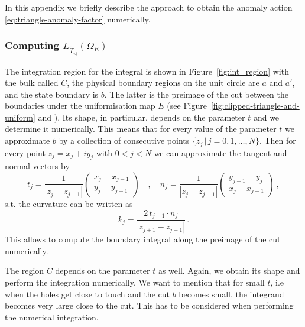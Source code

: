 \documentclass[11pt,a4paper]{article}
\numberwithin{equation}{section}
\begin{document}
In this appendix we briefly describe the approach to obtain the anomaly action \eqref{eq:triangle-anomaly-factor} numerically. 


\subsubsection*{Computing $L_{\widetilde T_\triangleleft}(\Omega_E)$}

The integration region for the integral is shown in Figure~\ref{fig:int_region} with the bulk called $C$, the physical boundary regions on the unit circle are $a$ and $a'$, and the state boundary is $b$. The latter is the preimage of the cut between the boundaries under the uniformisation map $E$  (see Figure~\ref{fig:clipped-triangle-and-uniform} and \cite[Fig.\,15]{Brehm:2021wev}). Its shape, in particular, depends on the parameter $t$ and we determine it numerically. This means that for every value of the parameter $t$ we approximate $b$ by a collection of consecutive points $\{z_j\, | \, j= 0,1,\dots, N\}$. Then for every point $z_j = x_j + i y_j $ with $0<j<N$ we can approximate the tangent and normal vectors by 
%
\begin{equation}
    t_j = \frac{1}{|z_{j}-z_{j-1}|} \left(\begin{matrix}
        x_j -x_{j-1}\\ y_j - y_{j-1}
    \end{matrix}\right)
    \quad , \quad
    n_j = \frac{1}{|z_{j}-z_{j-1}|} \left(\begin{matrix}
        y_{j-1} - y_{j} \\  x_j -x_{j-1}
    \end{matrix}\right) \ ,
\end{equation}
%
s.t. the curvature can be written as
%
\begin{equation}
    k_j =   \frac{2\,t_{j+1}\cdot n_j}{|z_{j+1}-z_{j-1}|}\,.
\end{equation}
%
This allows to compute the boundary integral along the preimage of the cut numerically. 

The region $C$ depends on the parameter $t$ as well. Again, we obtain its shape  and perform the integration numerically. We want to mention that for small $t$, i.e when the holes get close to touch and the cut $b$ becomes small, the integrand becomes very large close to the cut. This has to be considered when performing the numerical integration. 
\end{document}
